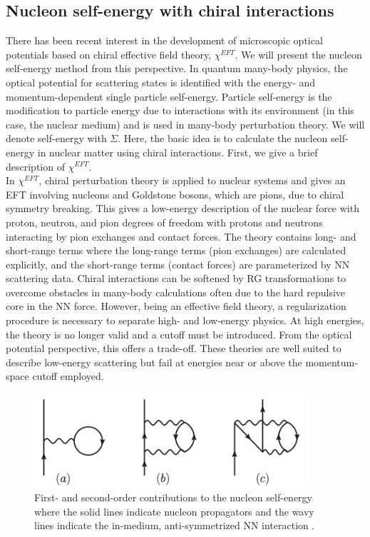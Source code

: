 \documentclass[preprintnumbers,floatfix,aps,prc,preprint,nofootinbib]{revtex4-1}
\begin{document}
	
\subsection{Nucleon self-energy with chiral interactions}
\label{sec:nucleon_self_energy}

There has been recent interest in the development of microscopic optical potentials based on chiral effective field theory, $\chi^{EFT}$. We will present the nucleon self-energy method from this perspective. In quantum many-body physics, the optical potential for scattering states is identified with the energy- and momentum-dependent single particle self-energy. Particle self-energy is the modification to particle energy due to interactions with its environment (in this case, the nuclear medium) and is used in many-body perturbation theory. We will denote self-energy with $\Sigma$. Here, the basic idea is to calculate the nucleon self-energy in nuclear matter using chiral interactions. First, we give a brief description of $\chi^{EFT}$.
\\

In $\chi^{EFT}$, chiral perturbation theory is applied to nuclear systems and gives an EFT involving nucleons and Goldstone bosons, which are pions, due to chiral symmetry breaking. This gives a low-energy description of the nuclear force with proton, neutron, and pion degrees of freedom with protons and neutrons interacting by pion exchanges and contact forces. The theory contains long- and short-range terms where the long-range terms (pion exchanges) are calculated explicitly, and the short-range terms (contact forces) are parameterized by NN scattering data. Chiral interactions can be softened by RG transformations to overcome obstacles in many-body calculations often due to the hard repulsive core in the NN force. However, being an effective field theory, a regularization procedure is necessary to separate high- and low-energy physics. At high energies, the theory is no longer valid and a cutoff must be introduced. From the optical potential perspective, this offers a trade-off. These theories are well suited to describe low-energy scattering but fail at energies near or above the momentum-space cutoff employed.
\\

%
\begin{figure}
	\captionsetup{singlelinecheck=false,justification=raggedright}
	\centering
	\includegraphics[width=10cm]{nucleon_self_energy}
	\caption{First- and second-order contributions to the nucleon self-energy where the solid lines indicate nucleon propagators and the wavy lines indicate the in-medium, anti-symmetrized NN interaction \cite{Whitehead:2018bfs}.}
	\label{fig:nucleon_self_energy}
\end{figure}
%
\end{document}

